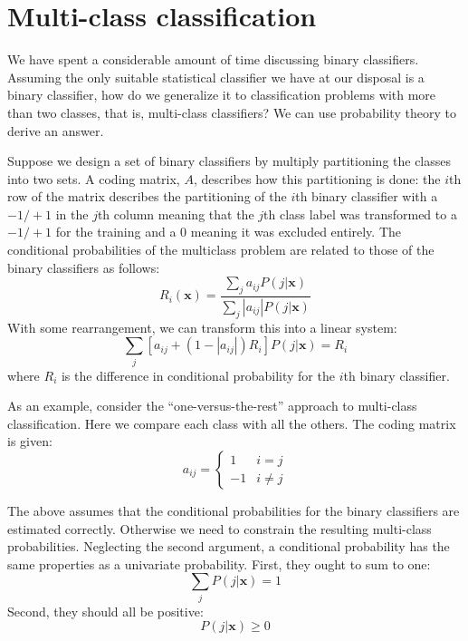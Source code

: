 \documentclass{article}
\renewcommand{\vec}[1]{\boldsymbol{#1}}
\begin{document}
\section{Multi-class classification}

We have spent a considerable amount of time discussing binary classifiers.
Assuming the only suitable statistical classifier we have at our disposal is a 
binary classifier, how do we generalize it to 
classification problems with more than two classes,
that is, multi-class classifiers?
We can use probability theory to derive an answer.

Suppose we design a set of binary classifiers by
multiply partitioning the classes into two sets.
A coding matrix, $A$, describes how this partitioning is done:
the $i$th row of the matrix describes the partitioning of the $i$th
binary classifier with a $-1/+1$ in the $j$th column meaning that the $j$th
class label was transformed to a $-1/+1$ for the training 
and a $0$ meaning it was excluded entirely.
The conditional probabilities of the multiclass problem 
are related to those of the binary classifiers as follows:
\begin{equation}
	R_i (\vec x) = \frac{\sum_j a_{ij} P(j | \vec x)}
	{\sum_j | a_{ij} | P(j | \vec x)}
	\label{multiclass1}
\end{equation}
With some rearrangement, we can transform this into a linear system:
\begin{equation}
	\sum_j \left [ a_{ij} + (1 - |a_{ij}|) R_i \right ] P(j | \vec x) = R_i
	\label{multiclass2}
\end{equation}
where $R_i$ is the difference in conditional probability for the $i$th binary
classifier.

As an example, consider the ``one-versus-the-rest'' approach to multi-class
classification.
Here we compare each class with all the others.
The coding matrix is given:
\begin{equation}
	a_{ij} = \left \lbrace \begin{array}{rl}
		1 & i = j \\
		-1 & i \ne j
	\end{array} \right .
	\label{onevr}
\end{equation}

The above assumes that the conditional probabilities for the binary classifiers
are estimated correctly.
Otherwise we need to constrain the resulting multi-class probabilities.
Neglecting the second argument, 
a conditional probability has the same properties as a univariate probability.
First, they ought to sum to one:
\begin{equation}
	\sum_j P(j|\vec x) = 1
	\label{norm}
\end{equation}
Second, they should all be positive:
\begin{equation}
	P(j|\vec x) \ge 0
\end{equation}
\end{document}
